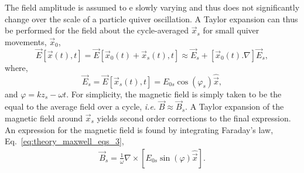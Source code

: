 The field amplitude is assumed to e slowly varying and thus does not significantly change over the scale of a particle quiver oscillation.
A Taylor expansion can thus be performed for the field about the cycle-averaged $\vec{x}_s$ for small quiver movements, $\vec{x}_0$,
\begin{equation}
    \vec{E}\left[\vec{x}(t),t\right] = \vec{E}\left[\vec{x}_0(t) + \vec{x}_s(t),t\right] \approx \vec{E}_s + \left[ \vec{x}_0(t).\nabla \right] \vec{E}_s,
\end{equation}
where,
\begin{equation}
    \vec{E}_s = \vec{E}\left[ \vec{x}_s(t),t \right] = E_{0s} \cos{(\varphi_s)} \hat{\vec{x}},
\end{equation}
and $\varphi = kz_s - \omega t$.
For simplicity, the magnetic field is simply taken to be the equal to the average field over a cycle, \textit{i.e.} $\vec{B}\approx\vec{B}_s$.
A Taylor expansion of the magnetic field around $\vec{x}_s$ yields second order corrections to the final expression.
An expression for the magnetic field is found by integrating Faraday's law, Eq.~\ref{eq:theory_maxwell_eqs_3},
\begin{eqnarray}
    \label{eq:theory_ponder_B}
    \vec{B}_s = \frac{1}{\omega}\nabla\times \left[ E_{0s} \sin{(\varphi)} \hat{\vec{x}} \right].
\end{eqnarray}


